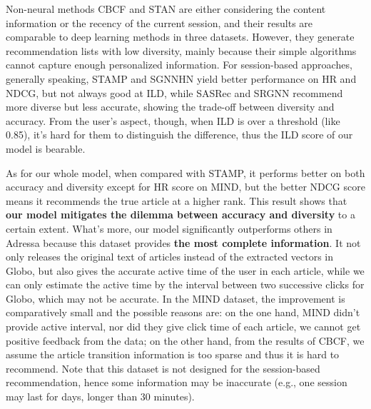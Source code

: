Non-neural methods CBCF and STAN are either considering the content information or the recency of the current session, and their results are comparable to deep learning methods in three datasets. However, they generate recommendation lists with low diversity, mainly because their simple algorithms cannot capture enough personalized information. For session-based approaches, generally speaking, STAMP and SGNNHN yield better performance on HR and NDCG, but not always good at ILD, while SASRec and SRGNN recommend more diverse but less accurate, showing the trade-off between diversity and accuracy. From the user's aspect, though, when ILD is over a threshold (like 0.85), it's hard for them to distinguish the difference, thus the ILD score of our model is bearable. 

As for our whole model, when compared with STAMP, it performs better on both accuracy and diversity 
except for HR score on MIND, but the better NDCG score means it recommends the true article
at a higher rank. This result shows that \textbf{our model mitigates the dilemma between accuracy and diversity} 
to a certain extent. What's more, our model significantly outperforms others in Adressa 
because this dataset provides \textbf{the most complete information}. It not only releases the original 
text of articles instead of the extracted vectors in Globo, but also gives the accurate active time 
of the user in each article, while we can only estimate the active time by the interval between 
two successive clicks for Globo, which may not be accurate. In the MIND dataset, 
the improvement is comparatively small and the possible reasons are: 
on the one hand, MIND didn't provide active interval, nor did they give click time of each article, 
we cannot get positive feedback from the data; on the other hand, from the results of CBCF, 
we assume the article transition information is too sparse and thus it is hard to recommend. 
Note that this dataset is not designed for the session-based recommendation, hence some information 
may be inaccurate (e.g., one session may last for days, longer than 30 minutes).


